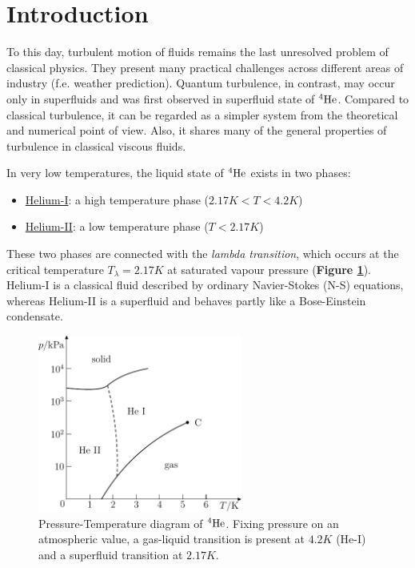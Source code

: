 \chapter*{Introduction}

	To this day, turbulent motion of fluids remains the last unresolved problem of classical physics. They present many practical challenges across different areas of industry (f.e. weather prediction). Quantum turbulence, in contrast, may occur only in superfluids and was first observed in superfluid state of ${}^4\mathrm{He}$. Compared to classical turbulence, it can be regarded as a simpler system from the theoretical and numerical point of view. Also, it shares many of the general properties of turbulence in classical viscous fluids.

	In very low temperatures, the liquid state of ${}^4\mathrm{He}$ exists in two phases:
	\begin{itemize}
		\item \underline{Helium-I}: a high temperature phase ($2.17\unit{K}<T<4.2\unit{K}$)
		\item \underline{Helium-II}: a low temperature phase ($T<2.17\unit{K}$)
	\end{itemize}

	These two phases are connected with the \textit{lambda transition}, which occurs at the critical temperature $T_{\lambda} = 2.17 \unit{K}$ at saturated vapour pressure (\textbf{Figure \ref{phase_diag}}). Helium-I is a classical fluid described by ordinary Navier-Stokes (N-S) equations, whereas Helium-II is a superfluid and behaves partly like a Bose-Einstein condensate.

	\begin{figure}[h]
		\centering
		\includegraphics[width=0.6\textwidth]{graphics/theory/phase_diag}
		\caption{Pressure-Temperature diagram of ${}^4\mathrm{He}$. Fixing pressure on an atmospheric value, a gas-liquid transition is present at $4.2\unit{K}$ (He-I) and a superfluid transition at $2.17\unit{K}$.}
		\label{phase_diag}
	\end{figure}

